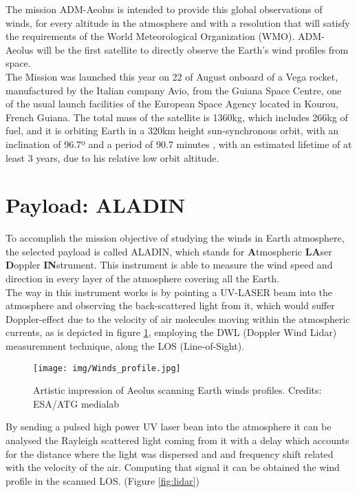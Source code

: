 The mission ADM-Aeolus is intended to provide this global observations of winds,
for every altitude in the atmosphere and with a resolution that will satisfy the
requirements of the World Meteorological Organization (WMO). ADM-Aeolus will
be the first satellite to directly observe the Earth’s wind profiles from space.
\cite{Endemann2004}\\

The Mission was launched this year on 22 of August onboard of a Vega rocket, manufactured
by the Italian company Avio, from the Guiana Space Centre, one of the usual launch
facilities of the European Space Agency located in Kourou, French Guiana. The total
mass of the satellite is 1360kg, which includes 266kg of fuel, and it is orbiting
Earth in a 320km height sun-synchronous orbit, with an inclination of 96.7º and a period
of 90.7 minutes \cite{aeolus_n2yo.com}, with an estimated lifetime of at least
3 years, due to his relative low orbit altitude.

\section{Payload: ALADIN}

To accomplish the mission objective of studying the winds in Earth atmosphere, the
selected payload is called ALADIN, which stands for \textbf{A}tmospheric \textbf{LA}ser
\textbf{D}oppler \textbf{IN}strument. This instrument is able to measure the
wind speed and direction in every layer of the atmosphere covering all the Earth.\\

The way in this instrument works is by pointing a UV-LASER beam into the atmosphere
and observing the back-scattered light from it, which would suffer Doppler-effect
due to the velocity of air molecules moving within the atmospheric currents, as
is depicted in figure \ref{fig:scanning}, employing the DWL (Doppler Wind Lidar) measuremnent
technique, along the LOS (Line-of-Sight).\\

\begin{figure}[h]
	\centering
	\texttt{[image: img/Winds\_profile.jpg]}
	\caption[Wind profile scanning]{Artistic impression of Aeolus scanning Earth winds profiles.
	Credits: ESA/ATG medialab \cite{scanning}}
	\label{fig:scanning}
\end{figure}

By sending a pulsed high power UV laser bean into the atmosphere it can be analysed
the Rayleigh scattered light coming from it with a delay which accounts for the
distance where the light was dispersed and and frequency shift related with the velocity
of the air. Computing that signal it can be obtained the wind profile in the scanned
LOS. (Figure \ref{fig:lidar})\\

